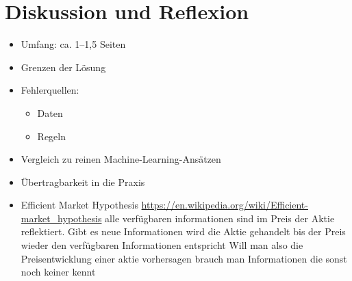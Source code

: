 \section{Diskussion und Reflexion}
\begin{itemize}
    \item Umfang: ca. 1--1,5 Seiten
    \item Grenzen der Lösung
    \item Fehlerquellen:
    \begin{itemize}
        \item Daten
        \item Regeln
    \end{itemize}
    \item Vergleich zu reinen Machine-Learning-Ansätzen
    \item Übertragbarkeit in die Praxis
\end{itemize}

\begin{itemize}
    \item Efficient Market Hypothesis
    \url{https://en.wikipedia.org/wiki/Efficient-market_hypothesis}
    alle verfügbaren informationen sind im Preis der Aktie reflektiert.
Gibt es neue Informationen wird die Aktie gehandelt bis der Preis wieder den verfügbaren Informationen entspricht
Will man also die Preisentwicklung einer aktie vorhersagen brauch man Informationen die sonst noch keiner kennt
\end{itemize}
